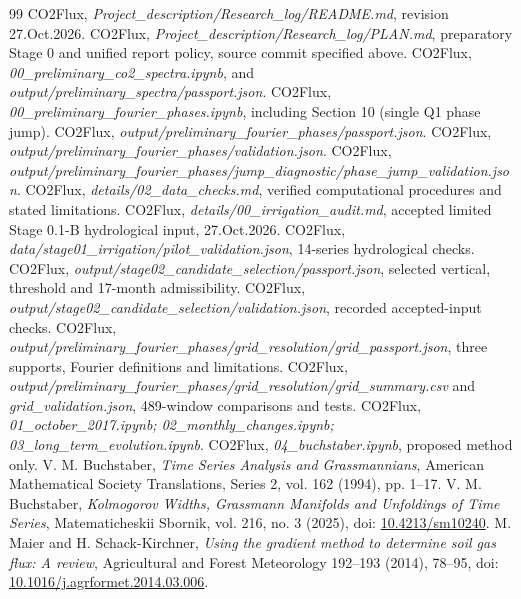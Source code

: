 \documentclass[11pt,letterpaper]{article}
\begin{document}
\begin{thebibliography}{99}
 CO2Flux, \emph{Project\_description/Research\_log/README.md}, revision 27.Oct.2026.
 CO2Flux, \emph{Project\_description/Research\_log/PLAN.md}, preparatory Stage 0 and unified report policy, source commit specified above.
 CO2Flux, \emph{00\_preliminary\_co2\_spectra.ipynb}, and \emph{output/preliminary\_spectra/passport.json}.
 CO2Flux, \emph{00\_preliminary\_fourier\_phases.ipynb}, including Section 10 (single Q1 phase jump).
 CO2Flux, \emph{output/preliminary\_fourier\_phases/passport.json}.
 CO2Flux, \emph{output/preliminary\_fourier\_phases/validation.json}.
 CO2Flux, \emph{output/preliminary\_fourier\_phases/jump\_diagnostic/phase\_jump\_validation.json}.
 CO2Flux, \emph{details/02\_data\_checks.md}, verified computational procedures and stated limitations.
 CO2Flux,
\emph{details/00\_irrigation\_audit.md},
accepted limited Stage 0.1-B hydrological input, 27.Oct.2026.
 CO2Flux,
\emph{data/stage01\_irrigation/pilot\_validation.json},
14-series hydrological checks.
 CO2Flux,
\emph{output/stage02\_candidate\_selection/passport.json},
selected vertical, threshold and 17-month admissibility.
 CO2Flux,
\emph{output/stage02\_candidate\_selection/validation.json},
recorded accepted-input checks.
 CO2Flux,
\emph{output/preliminary\_fourier\_phases/grid\_resolution/grid\_passport.json},
three supports, Fourier definitions and limitations.
 CO2Flux,
\emph{output/preliminary\_fourier\_phases/grid\_resolution/grid\_summary.csv}
and \emph{grid\_validation.json}, 489-window comparisons and tests.
 CO2Flux, \emph{01\_october\_2017.ipynb; 02\_monthly\_changes.ipynb; 03\_long\_term\_evolution.ipynb}.
 CO2Flux, \emph{04\_buchstaber.ipynb}, proposed method only.
 V. M. Buchstaber, \emph{Time Series Analysis and Grassmannians}, American Mathematical Society Translations, Series 2, vol. 162 (1994), pp. 1--17.
 V. M. Buchstaber, \emph{Kolmogorov Widths, Grassmann Manifolds and Unfoldings of Time Series}, Matematicheskii Sbornik, vol. 216, no. 3 (2025), doi: \href{https://doi.org/10.4213/sm10240}{10.4213/sm10240}.
 M. Maier and H. Schack-Kirchner, \emph{Using the gradient method to determine soil gas flux: A review}, Agricultural and Forest Meteorology 192--193 (2014), 78--95, doi: \href{https://doi.org/10.1016/j.agrformet.2014.03.006}{10.1016/j.agrformet.2014.03.006}.
\end{thebibliography}
\end{document}
